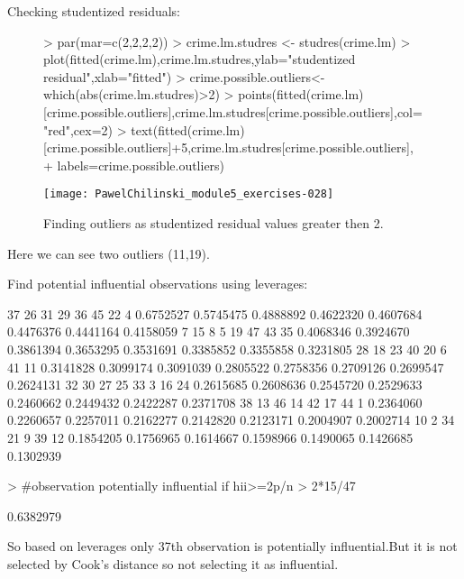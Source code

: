 \documentclass[a4paper]{article}
\begin{document}
\begin{itemize}
\begin{itemize}
Checking studentized residuals:
\begin{figure}[H]
\begin{center}
\begin{Schunk}
\begin{Sinput}
> par(mar=c(2,2,2,2))
> crime.lm.studres <- studres(crime.lm)
> plot(fitted(crime.lm),crime.lm.studres,ylab="studentized residual",xlab="fitted")
> crime.possible.outliers<-which(abs(crime.lm.studres)>2)
> points(fitted(crime.lm)[crime.possible.outliers],crime.lm.studres[crime.possible.outliers],col="red",cex=2)
> text(fitted(crime.lm)[crime.possible.outliers]+5,crime.lm.studres[crime.possible.outliers],
+ 		labels=crime.possible.outliers)
\end{Sinput}
\end{Schunk}
\texttt{[image: PawelChilinski\_module5\_exercises-028]}
\caption{Finding outliers as studentized residual values greater then 2.}
\end{center}
\end{figure}
Here we can see two outliers (11,19).

Find potential influential observations using leverages:
\begin{Schunk}
\begin{Soutput}
       37        26        31        29        36        45        22         4 
0.6752527 0.5745475 0.4888892 0.4622320 0.4607684 0.4476376 0.4441164 0.4158059 
        7        15         8         5        19        47        43        35 
0.4068346 0.3924670 0.3861394 0.3653295 0.3531691 0.3385852 0.3355858 0.3231805 
       28        18        23        40        20         6        41        11 
0.3141828 0.3099174 0.3091039 0.2805522 0.2758356 0.2709126 0.2699547 0.2624131 
       32        30        27        25        33         3        16        24 
0.2615685 0.2608636 0.2545720 0.2529633 0.2460662 0.2449432 0.2422287 0.2371708 
       38        13        46        14        42        17        44         1 
0.2364060 0.2260657 0.2257011 0.2162277 0.2142820 0.2123171 0.2004907 0.2002714 
       10         2        34        21         9        39        12 
0.1854205 0.1756965 0.1614667 0.1598966 0.1490065 0.1426685 0.1302939 
\end{Soutput}
\begin{Sinput}
> #observation potentially influential if hii>=2p/n
> 2*15/47
\end{Sinput}
\begin{Soutput}
[1] 0.6382979
\end{Soutput}
\end{Schunk}
So based on leverages only 37th observation is potentially influential.But it
is not selected by Cook's distance so not selecting it as influential.


\end{itemize}
\end{itemize}
\end{document}
